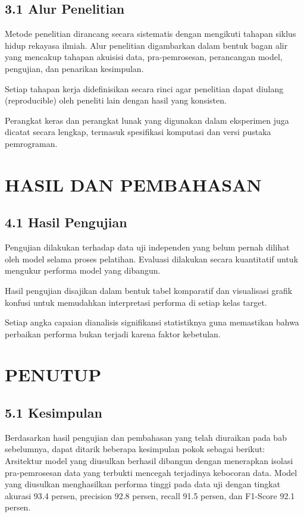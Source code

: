 \documentclass[12pt,a4paper,oneside]{report}
\begin{document}
\section{3.1 Alur Penelitian}
Metode penelitian dirancang secara sistematis dengan mengikuti tahapan siklus hidup rekayasa ilmiah. Alur penelitian digambarkan dalam bentuk bagan alir yang mencakup tahapan akuisisi data, pra-pemrosesan, perancangan model, pengujian, dan penarikan kesimpulan.

Setiap tahapan kerja didefinisikan secara rinci agar penelitian dapat diulang (reproducible) oleh peneliti lain dengan hasil yang konsisten.

Perangkat keras dan perangkat lunak yang digunakan dalam eksperimen juga dicatat secara lengkap, termasuk spesifikasi komputasi dan versi pustaka pemrograman.

\chapter{HASIL DAN PEMBAHASAN}
\section{4.1 Hasil Pengujian}
Pengujian dilakukan terhadap data uji independen yang belum pernah dilihat oleh model selama proses pelatihan. Evaluasi dilakukan secara kuantitatif untuk mengukur performa model yang dibangun.

Hasil pengujian disajikan dalam bentuk tabel komparatif dan visualisasi grafik konfusi untuk memudahkan interpretasi performa di setiap kelas target.

Setiap angka capaian dianalisis signifikansi statistiknya guna memastikan bahwa perbaikan performa bukan terjadi karena faktor kebetulan.

\chapter{PENUTUP}
\section{5.1 Kesimpulan}
Berdasarkan hasil pengujian dan pembahasan yang telah diuraikan pada bab sebelumnya, dapat ditarik beberapa kesimpulan pokok sebagai berikut:
Arsitektur model yang diusulkan berhasil dibangun dengan menerapkan isolasi pra-pemrosesan data yang terbukti mencegah terjadinya kebocoran data.
Model yang diusulkan menghasilkan performa tinggi pada data uji dengan tingkat akurasi 93.4 persen, precision 92.8 persen, recall 91.5 persen, dan F1-Score 92.1 persen.
\end{document}
